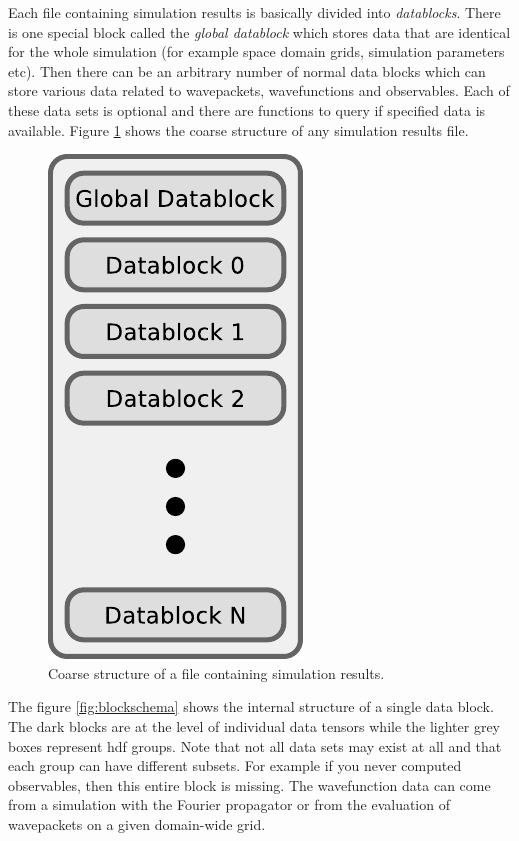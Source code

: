 \documentclass[a4paper,10pt]{report}
\begin{document}
Each file containing simulation results is basically divided into \emph{datablocks}.
There is one special block called the \emph{global datablock} which stores
data that are identical for the whole simulation (for example space domain grids,
simulation parameters etc). Then there can be an arbitrary number of normal data
blocks which can store various data related to wavepackets, wavefunctions and observables.
Each of these data sets is optional and there are functions to query if specified
data is available. Figure \ref{fig:hdfschema} shows the coarse structure of any
simulation results file.

\begin{figure}
  \centering
  \includegraphics[scale=0.75]{./fig/structure_result_file.pdf}
  \caption{Coarse structure of a file containing simulation results.}
  \label{fig:hdfschema}
\end{figure}

The figure \ref{fig:blockschema} shows the internal structure of a single data
block. The dark blocks are at the level of individual data tensors while the
lighter grey boxes represent hdf groups. Note that not all data sets may exist
at all and that each group can have different subsets. For example if you never
computed observables, then this entire block is missing. The wavefunction data
can come from a simulation with the Fourier propagator or from the evaluation
of wavepackets on a given domain-wide grid.
\end{document}

